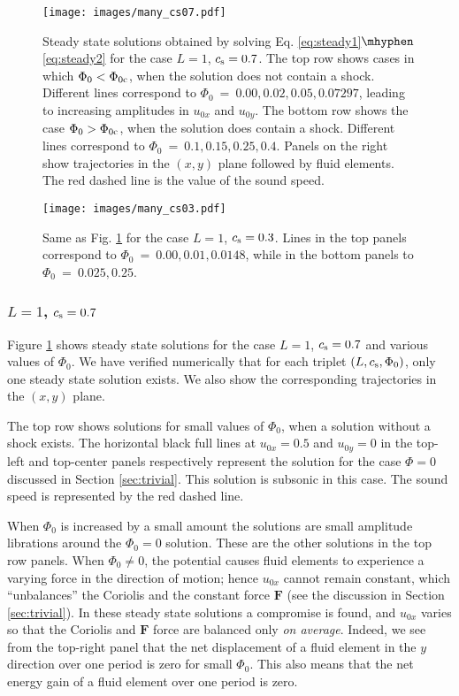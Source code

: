 \documentclass[useAMS,usenatbib]{mn2e}
\begin{document}
\begin{figure*}
\texttt{[image: images/many\_cs07.pdf]}
 \caption{Steady state solutions obtained by solving Eq. \eqref{eq:steady1}$\mhyphen$\eqref{eq:steady2} for the case $L=1$, $c_{\rm s}=0.7$. The top row shows cases in which $\Phi_0<\Phi_{0\rm{c}}$, when the solution does not contain a shock. Different lines correspond to $\Phi_0~=~0.00,0.02,0.05,0.07297$, leading to increasing amplitudes in $u_{0x}$ and $u_{0y}$. The bottom row shows the case $\Phi_0>\Phi_{0\rm{c}}$, when the solution does contain a shock. Different lines correspond to $\Phi_0~=~0.1,0.15,0.25,0.4$. Panels on the right show trajectories in the $(x,y)$ plane followed by fluid elements. The red dashed line is the value of the sound speed.}
\label{fig:steady07} 
\end{figure*}
%
\begin{figure*}
\texttt{[image: images/many\_cs03.pdf]}
 \caption{
Same as Fig. \ref{fig:steady07} for the case $L=1$, $c_{\rm s}=0.3$. Lines in the top panels correspond to $\Phi_0~=~0.00,0.01,0.0148$, while in the bottom panels to $\Phi_0~=~0.025,0.25$.}
\label{fig:steady03} 
\end{figure*}

\subsubsection{$L=1$, $c_{\rm s}=0.7$} \label{sec:caseL1cs07}

Figure \ref{fig:steady07} shows steady state solutions for the case $L=1$, $c_{\rm s}=0.7$ and various values of $\Phi_0$. We have verified numerically that for each triplet $(L,c_{\rm s},\Phi_0)$, only one steady state solution exists. We also show the corresponding trajectories in the $(x,y)$ plane. 

The top row shows solutions for small values of $\Phi_0$, when a solution without a shock exists. The horizontal black full lines at $u_{0x}=0.5$ and $u_{0y}=0$ in the top-left and top-center panels respectively represent the solution for the case $\Phi=0$ discussed in Section \ref{sec:trivial}. This solution is subsonic in this case. The sound speed is represented by the red dashed line. 

When $\Phi_0$ is increased by a small amount the solutions are small amplitude librations around the $\Phi_0=0$ solution. These are the other solutions in the top row panels. When $\Phi_0\neq0$, the potential causes fluid elements to experience a varying force in the direction of motion; hence $u_{0x}$ cannot remain constant, which ``unbalances'' the Coriolis and the constant force $\mathbf{F}$ (see the discussion in Section \ref{sec:trivial}). In these steady state solutions a compromise is found, and $u_{0x}$ varies so that the Coriolis and $\mathbf{F}$ force are balanced only \emph{on average}. Indeed, we see from the top-right panel that the net displacement of a fluid element in the $y$ direction over one period is zero for small $\Phi_0$. This also means that the net energy gain of a fluid element over one period is zero.
\end{document}
